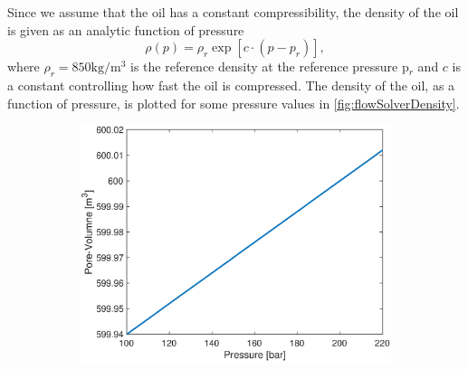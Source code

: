 Since we assume that the oil has a constant compressibility, the density of the oil is given as an analytic function of pressure 
\begin{equation}
    \rho(p) = \rho_r\exp[c\cdot(p-p_r)],
    \label{eq:pressureSolverDensity}
\end{equation}
where $\rho_r = 850\text{kg}/\text{m}^3$ is the reference density at the reference pressure p$_r$ and $c$ is a constant controlling how fast the oil is compressed. The density of the oil, as a function of pressure, is plotted for some pressure values in \autoref{fig:flowSolverDensity}.
\begin{figure}[H]
    \centering
    \begin{subfigure}[t]{0.48\textwidth}
        \includegraphics[width=\textwidth]{figures/flow_solver_pore-volume.eps}
        \caption{}
        \label{fig:flowSolverPoreVolume}
        

\end{subfigure}
\end{figure}
